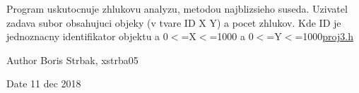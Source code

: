 Program uskutocnuje zhlukovu analyzu, metodou najblizsieho suseda. Uzivatel zadava subor obsahujuci objeky (v tvare ID X Y) a pocet zhlukov. Kde ID je jednoznacny identifikator objektu a 0$<$=X$<$=1000 a 0$<$=Y$<$=1000\hyperlink{proj3_8h}{proj3.\+h}

\begin{DoxyAuthor}{Author}
Boris Strbak, xstrba05
\end{DoxyAuthor}
\begin{DoxyDate}{Date}
11 dec 2018 
\end{DoxyDate}
